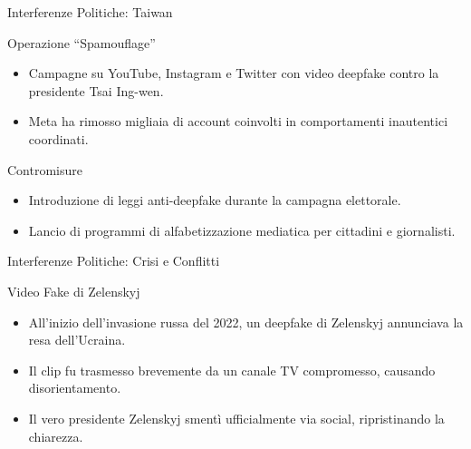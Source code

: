 \documentclass[12pt]{beamer}
\begin{document}
\begin{frame}{Interferenze Politiche: Taiwan}
  \small
  \begin{alertblock}{Operazione “Spamouflage”}
    \begin{itemize}
      \item Campagne su YouTube, Instagram e Twitter con video deepfake contro la presidente Tsai Ing-wen.\cite{taiwan_deepfake}
      \item Meta ha rimosso migliaia di account coinvolti in comportamenti inautentici coordinati.
    \end{itemize}
  \end{alertblock}
  \begin{alertblock}{Contromisure}
    \begin{itemize}
      \item Introduzione di leggi anti-deepfake durante la campagna elettorale.  
      \item Lancio di programmi di alfabetizzazione mediatica per cittadini e giornalisti.
    \end{itemize}
  \end{alertblock}
\end{frame}

\begin{frame}{Interferenze Politiche: Crisi e Conflitti}
  \small
  \begin{alertblock}{Video Fake di Zelenskyj}
    \begin{itemize}
      \item All’inizio dell’invasione russa del 2022, un deepfake di Zelenskyj annunciava la resa dell’Ucraina.\cite{zelensky_fake}
      \item Il clip fu trasmesso brevemente da un canale TV compromesso, causando disorientamento.
      \item Il vero presidente Zelenskyj smentì ufficialmente via social, ripristinando la chiarezza.
    \end{itemize}
  \end{alertblock}
\end{frame}


\end{document}
